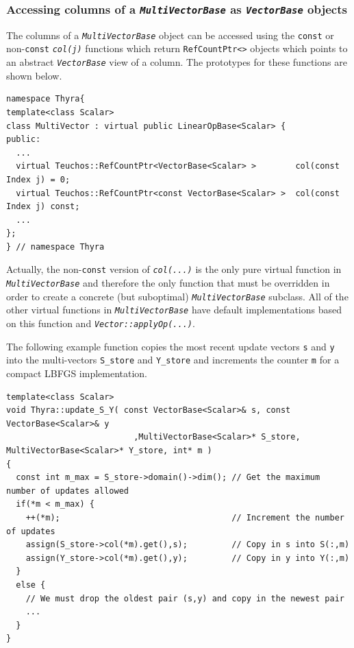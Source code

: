 \documentclass[pdf,ps2pdf,11pt]{SANDreport}
\begin{document}
%
\subsubsection{Accessing columns of a {}\texttt{\textit{Multi\-Vector\-Base}}
as {}\texttt{\textit{Vector\-Base}} objects}
%

The columns of a {}\texttt{\textit{Multi\-Vector\-Base}} object can be
accessed using the {}\texttt{const} or non-\texttt{const}
{}\texttt{\textit{col(j)}} functions which return
{}\texttt{RefCountPtr<>} objects which points to an abstract
{}\texttt{\textit{Vector\-Base}} view of a column.  The prototypes for these
functions are shown below.

{\scriptsize\begin{verbatim}
namespace Thyra{
template<class Scalar>
class MultiVector : virtual public LinearOpBase<Scalar> {
public:
  ...
  virtual Teuchos::RefCountPtr<VectorBase<Scalar> >        col(const Index j) = 0;
  virtual Teuchos::RefCountPtr<const VectorBase<Scalar> >  col(const Index j) const;
  ...
};
} // namespace Thyra
\end{verbatim}}

{}\noindent{}Actually, the non-\texttt{const} version of
{}\texttt{\textit{col(...)}}  is the only pure virtual function in
{}\texttt{\textit{Multi\-Vector\-Base}} and therefore the only function that
must be overridden in order to create a concrete (but suboptimal)
{}\texttt{\textit{Multi\-Vector\-Base}} subclass.  All of the other virtual
functions in {}\texttt{\textit{Multi\-Vector\-Base}} have default
implementations based on this function and
{}\texttt{\textit{Vector\-::applyOp(\-...)}}.

The following example function copies the most recent update vectors
{}\texttt{s} and {}\texttt{y} into the multi-vectors
{}\texttt{S\_store} and {}\texttt{Y\_store} and increments the counter
{}\texttt{m} for a compact LBFGS implementation.

{\scriptsize\begin{verbatim}
template<class Scalar>
void Thyra::update_S_Y( const VectorBase<Scalar>& s, const VectorBase<Scalar>& y
                          ,MultiVectorBase<Scalar>* S_store, MultiVectorBase<Scalar>* Y_store, int* m )
{
  const int m_max = S_store->domain()->dim(); // Get the maximum number of updates allowed
  if(*m < m_max) {
    ++(*m);                                   // Increment the number of updates
    assign(S_store->col(*m).get(),s);         // Copy in s into S(:,m)         
    assign(Y_store->col(*m).get(),y);         // Copy in y into Y(:,m)
  }
  else {
    // We must drop the oldest pair (s,y) and copy in the newest pair
    ...
  }
}
\end{verbatim}}
\end{document}
